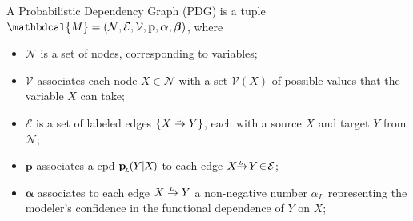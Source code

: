 \documentclass[twoside]{article}
\theoremstyle{plain}
\theoremstyle{definition}
\newcommand{\mat}[1]{\mathbf{#1}}
\newcommand{\ssub}[1]{_{\!_{#1}\!}}
\newcommand{\bp}[1][L]{\mat{p}\ssub{#1}}
\newcommand{\V}{\mathcal V}
\newcommand{\N}{\mathcal N}
\newcommand{\Ed}{\mathcal E}
\newcommand{\balpha}{\boldsymbol\alpha}
\newcommand{\bbeta}{\boldsymbol\beta}
\newcommand{\dg}[1]{\mathbdcal{#1}}
\newcommand{\ed}[3]{#2%
		  \overset{\smash{\mskip-5mu\raisebox{-1pt}{$\scriptscriptstyle
		        #1$}}}{\rightarrow} #3}
\begin{document}
\begin{defn}
    \label{defn:pdg}
	A Probabilistic Dependency Graph (PDG)
	is a tuple $\dg M = (\N,\Ed,\V,\mat p, \balpha, \bbeta)$, where
    \vspace{-1em}
    \begin{itemize}[leftmargin=1.5em, itemsep=0pt]
        \item $\N$
			is a set of nodes, corresponding to variables;
		\item $\V$
			associates each node $X \in \N$ with a set $\V(X)$ of possible values that the variable $X$ can take;
   		\item $\Ed$
			is a set of labeled  edges $\{ \ed LXY \}$, each with a source
			$X$ and target $Y$ from $\N$;
        \item $\mat p$
		associates
        a cpd $\bp(\mskip-1muY\mskip-1mu|\mskip-1muX\mskip-2mu)$
        to each edge $\ed L{X\!\!}{\!Y} \!\in\! \Ed$;
		\item $\boldsymbol\alpha$
		associates to each edge $\ed L{X}{Y}$ a non-negative number $\alpha_L$
	    representing
	    the modeler's confidence in the functional dependence of $Y$ on $X$;


\end{itemize}
\end{defn}
\end{document}
